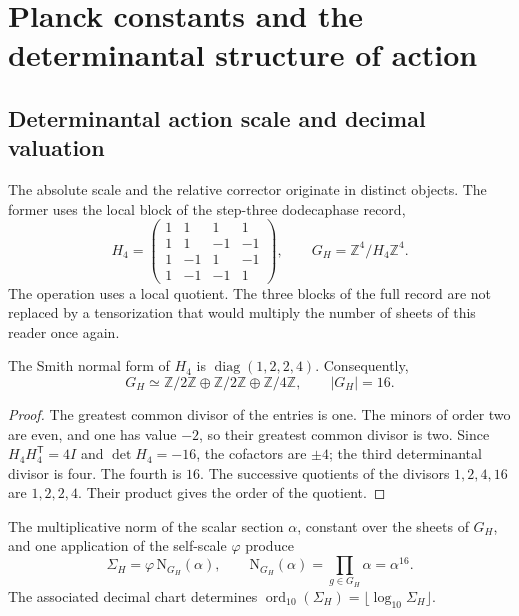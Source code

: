 \section{Planck constants and the determinantal structure of action}
\label{v:ant:sec:action}
\subsection{Determinantal action scale and decimal valuation}

The absolute scale and the relative corrector originate in distinct
objects. The former uses the local block of the step-three
dodecaphase record,
\begin{equation}
 H_4=\begin{pmatrix}
 1&1&1&1\\1&1&-1&-1\\1&-1&1&-1\\1&-1&-1&1
 \end{pmatrix},\qquad
 G_H=\mathbb Z^4/H_4\mathbb Z^4.
 \label{v:ant:eq:el-h4}
\end{equation}
The operation uses a local quotient. The three blocks of the full
record are not replaced by a tensorization that would multiply
the number of sheets of this reader once again.

\begin{lemma}
The Smith normal form of \(H_4\) is
\(\operatorname{diag}(1,2,2,4)\). Consequently,
\[
 G_H\simeq\mathbb Z/2\mathbb Z\oplus\mathbb Z/2\mathbb Z
 \oplus\mathbb Z/4\mathbb Z,\qquad |G_H|=16.
\]
\end{lemma}
\begin{proof}
The greatest common divisor of the entries is one. The minors of order two
are even, and one has value \(-2\), so their greatest common divisor
is two. Since \(H_4H_4^{\mathsf T}=4I\) and \(\det H_4=-16\), the
cofactors are \(\pm4\); the third determinantal divisor is four.
The fourth is \(16\). The successive quotients of the divisors
\(1,2,4,16\) are \(1,2,2,4\). Their product gives the order of the quotient.
\end{proof}

\begin{definition}
The multiplicative norm of the scalar section \(\alpha\), constant
over the sheets of \(G_H\), and one application of the self-scale
\(\varphi\) produce
\begin{equation}
 \Sigma_H=\varphi\,\mathrm N_{G_H}(\alpha),\qquad
 \mathrm N_{G_H}(\alpha)=\prod_{g\in G_H}\alpha=\alpha^{16}.
 \label{v:ant:eq:el-lector-determinantal}
\end{equation}
The associated decimal chart determines
\(\operatorname{ord}_{10}(\Sigma_H)=\lfloor\log_{10}\Sigma_H\rfloor\).
\end{definition}

